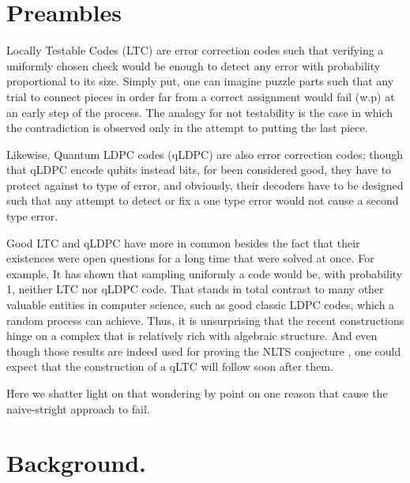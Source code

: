 \documentclass[manuscript,screen,review]{acmart}
\begin{document}
\section{Preambles}

Locally Testable Codes (LTC) are error correction codes such that verifying a uniformly chosen check would be enough to detect any error with probability proportional to its size. Simply put, one can imagine puzzle parts such that any trial to connect pieces in order far from a correct assignment would fail (w.p) at an early step of the process. The analogy for not testability is the case in which the contradiction is observed only in the attempt to putting the last piece.
 
 Likewise, Quantum LDPC codes (qLDPC) are also error correction codes; though that qLDPC encode qubits instead bits, for been considered good, they have to protect against to type of error, and obviously, their decoders have to be designed such that any attempt to detect or fix a one type error would not cause a second type error.
 
 Good LTC and qLDPC have more in common besides the fact that their existences were open questions for a long time that were solved at once. For example, It has shown that sampling uniformly a code would be, with probability 1, neither LTC \cite{Sasson} nor qLDPC code. That stands in total contrast to many other valuable entities in computer science,  such as good classic LDPC codes, which a random process can achieve. Thus, it is unsurprising that the recent constructions hinge on a complex that is relatively rich with algebraic structure. And even though those results are indeed used for proving the NLTS conjecture \cite{anshu2022nlts}, one could expect that the construction of a qLTC will follow soon after them. 

 Here we shatter light on that wondering by point on one reason that cause the naive-stright approach to fail. 



\section{Background.}
\end{document}
